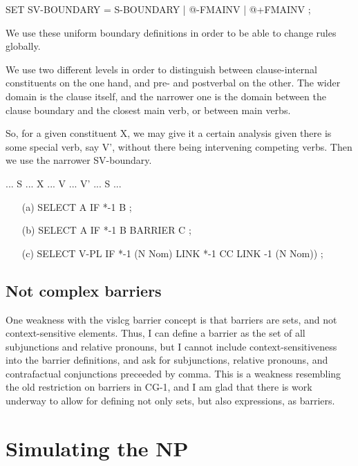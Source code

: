 \documentclass[a4paper,english]{article} %
\begin{document}
\begin{example}\label{sv}
SET SV-BOUNDARY = S-BOUNDARY | @-FMAINV | @+FMAINV ;
\end{example}

We use these uniform boundary definitions in order to be able to change rules globally.%

We use two different levels in order to distinguish between clause-internal constituents on the one hand, and pre- and postverbal on the other. The wider domain is the clause itself, and the narrower one is the domain between the clause boundary and the closest main verb, or between main verbs.%

So, for a given constituent X, we may give it a certain analysis given there is some special verb, say V', without there being intervening competing verbs. Then we use the narrower SV-boundary.%

\begin{example}\label{svx}
... S ... X ... V ... V' ... S ...
\end{example}

\begin{example}\label{ped}
\begin{itemize}
\item[(a)] SELECT A IF *-1 B ;
\item[(b)] SELECT A IF *-1 B BARRIER C ;
\item[(c)] SELECT V-PL IF *-1 (N Nom) LINK *-1 CC LINK -1 (N Nom)) ;
\end{itemize}
\end{example}




\subsection{Not complex barriers}

One weakness with the vislcg barrier concept is that barriers are sets, and not context-sensitive elements. Thus, I can define a barrier as the set of all subjunctions and relative pronouns, but I cannot include context-sensitiveness into the barrier definitions, and ask for subjunctions, relative pronouns, and contrafactual conjunctions preceeded by comma. This is a weakness resembling the old restriction on barriers in CG-1, and I am glad that there is work underway to allow for defining not only sets, but also expressions, as barriers.  %


\section{Simulating the NP}
\end{document}
